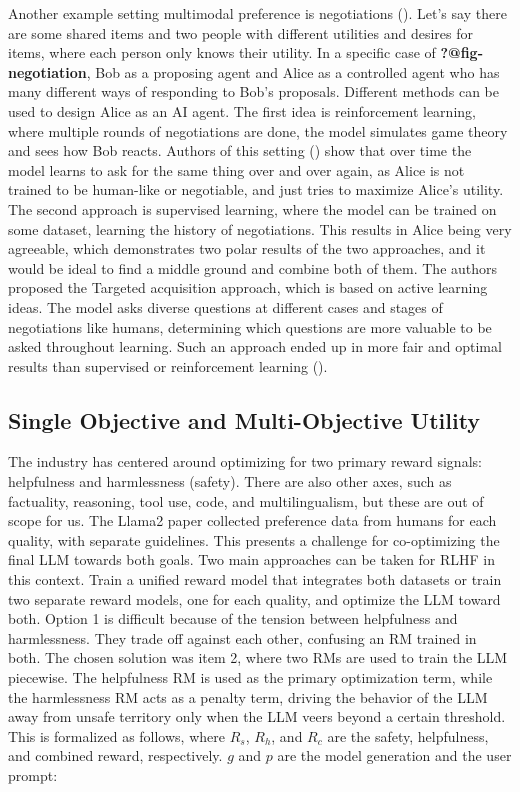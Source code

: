 \documentclass[
  letterpaper,
  numbers=noenddot,
  DIV=11]{scrreprt}
\theoremstyle{plain}
\theoremstyle{definition}
\theoremstyle{remark}
\begin{document}
Another example setting multimodal preference is negotiations
(). Let's say there are
some shared items and two people with different utilities and desires
for items, where each person only knows their utility. In a specific
case of \textbf{?@fig-negotiation}, Bob as a proposing agent and Alice
as a controlled agent who has many different ways of responding to Bob's
proposals. Different methods can be used to design Alice as an AI agent.
The first idea is reinforcement learning, where multiple rounds of
negotiations are done, the model simulates game theory and sees how Bob
reacts. Authors of this setting () show that over time the model learns to ask for the same
thing over and over again, as Alice is not trained to be human-like or
negotiable, and just tries to maximize Alice's utility. The second
approach is supervised learning, where the model can be trained on some
dataset, learning the history of negotiations. This results in Alice
being very agreeable, which demonstrates two polar results of the two
approaches, and it would be ideal to find a middle ground and combine
both of them. The authors proposed the Targeted acquisition approach,
which is based on active learning ideas. The model asks diverse
questions at different cases and stages of negotiations like humans,
determining which questions are more valuable to be asked throughout
learning. Such an approach ended up in more fair and optimal results
than supervised or reinforcement learning
().

\subsection{Single Objective and Multi-Objective
Utility}\label{single-objective-and-multi-objective-utility}

The industry has centered around optimizing for two primary reward
signals: helpfulness and harmlessness (safety). There are also other
axes, such as factuality, reasoning, tool use, code, and
multilingualism, but these are out of scope for us. The Llama2 paper
collected preference data from humans for each quality, with separate
guidelines. This presents a challenge for co-optimizing the final LLM
towards both goals. Two main approaches can be taken for RLHF in this
context. Train a unified reward model that integrates both datasets or
train two separate reward models, one for each quality, and optimize the
LLM toward both. Option 1 is difficult because of the tension between
helpfulness and harmlessness. They trade off against each other,
confusing an RM trained in both. The chosen solution was item 2, where
two RMs are used to train the LLM piecewise. The helpfulness RM is used
as the primary optimization term, while the harmlessness RM acts as a
penalty term, driving the behavior of the LLM away from unsafe territory
only when the LLM veers beyond a certain threshold. This is formalized
as follows, where \(R_s\), \(R_h\), and \(R_c\) are the safety,
helpfulness, and combined reward, respectively. \(g\) and \(p\) are the
model generation and the user prompt:
\end{document}
